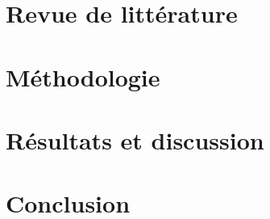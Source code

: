 \documentclass[twocolumn,dvipsnames]{llncs}
\begin{document}
    \section{Revue de littérature}

    \section{Méthodologie}

    \section{Résultats et discussion}

    \section{Conclusion}

    \printbibliography[heading=bibintoc]
\end{document}
